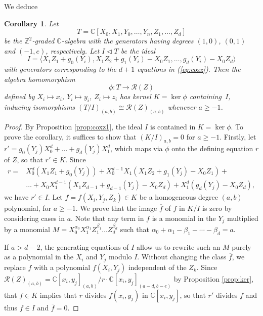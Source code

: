 \documentclass[a4paper,11pt]{amsart}
\theoremstyle{plain}
\newtheorem{corollary}[theorem]{Corollary}
\theoremstyle{definition}
\newcommand{\C}{\mathbb{C}}
\newcommand{\R}{\mathcal{R}}
\newcommand{\Z}{\mathbb{Z}}
\begin{document}
We deduce

\begin{corollary} \label{cor:partialdescription} Let
\[T = \C[X_0,X_1,Y_0,\dots,Y_n,Z_1,\dots,Z_d]\]
be the $\Z^2$-graded $\C$-algebra with the generators having degrees $(1,0)$, $(0,1)$ and $(-1,e)$, respectively. Let $I\lhd T$ be the ideal 
\[ I = \langle X_1 Z_1 + g_0(Y_i), X_1 Z_2 + g_1(Y_i) - X_0 Z_1,\ldots, g_d(Y_i) - X_0 Z_d\rangle\]
with generators corresponding to the $d+1$ equations in (\ref{eq:coxz}).
Then the algebra homomorphism 
\[ \phi : T \rightarrow \R(Z)
\]
defined by $X_i\mapsto x_i$, $Y_i\mapsto y_i$, $Z_i\mapsto z_i$ has kernel $K = \ker \phi$ containing~$I$, inducing isomorphisms $(T/I)_{(a,b)}\cong \R(Z)_{(a,b)}$ whenever $a \geqslant -1$.
\end{corollary}
\begin{proof}
By Proposition \ref{prop:coxz1}, the ideal $I$ is contained in $K = \ker \phi$. To prove the corollary, it suffices to show that $(K/I)_{a,b} = 0$ for $a \geqslant -1$.
Firstly, let $r' = g_0(Y_j)X_0^d + \dots + g_d(Y_j)X_1^d$, which maps via $\phi$ onto the defining equation $r$ of $Z$, so that $r' \in K$. Since
\begin{align*}
    r = &X_0^d \left(X_1 Z_1 + g_0(Y_j)\right) + X_0^{d-1} X_1 \left(X_1 Z_2 + g_1(Y_j) - X_0 Z_1\right) + \\ &\dots + X_0 X_1^{d-1} \left(X_1 Z_{d-1} + g_{d-1}(Y_j) - X_0 Z_d\right) + X_1^d \left(g_d(Y_j) - X_0 Z_d\right),
\end{align*}
we have $r' \in I$. Let $f = f(X_i,Y_j,Z_k)\in K$ be a homogeneous degree $(a,b)$ polynomial, for $a \geqslant -1$. We prove that the image $\overline{f}$ of $f$ in $K/I$ is zero by considering cases in $a$. Note that any term in $f$ is a monomial in the $Y_j$ multiplied by a monomial $M = X_0^{\alpha_0} X_1^{\alpha_1} Z_1^{\beta_1}\dots Z_d^{\beta_d}$ such that $\alpha_0 + \alpha_1 - \beta_1 - \cdots - \beta_d = a$.

If $a > d-2$, the generating equations of $I$ allow us to rewrite such an $M$ purely as a polynomial in the $X_i$ and $Y_j$ modulo $I$. Without changing the class $\overline{f}$, we replace $f$ with a polynomial $f(X_i,Y_j)$ independent of the $Z_k$. Since $\R(Z)_{(a,b)} = \C[x_i,y_j]_{(a,b)} / r\cdot \C[x_i,y_j]_{(a-d,b-e)}$ by Proposition \ref{prop:ker}, that $f \in K$ implies that $r$ divides $f(x_i,y_j)$ in $\C[x_i,y_j]$, so that $r'$ divides $f$ and thus $f \in I$ and $\overline{f} = 0$.


\end{proof}
\end{document}
